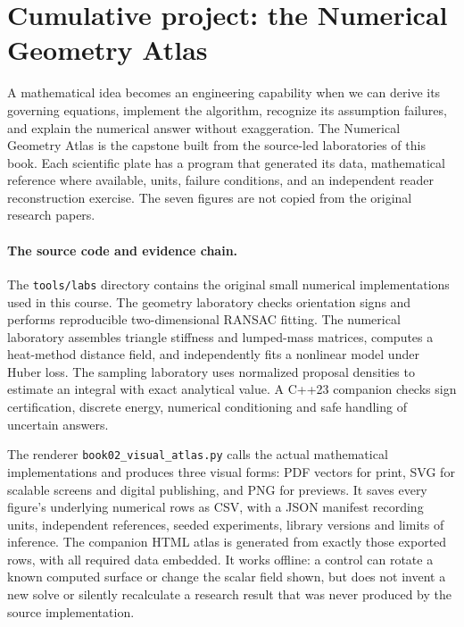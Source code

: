 \clearpage
\section*{Cumulative project: the Numerical Geometry Atlas}

\noindent A mathematical idea becomes an engineering capability when we can
derive its governing equations, implement the algorithm, recognize its
assumption failures, and explain the numerical answer without exaggeration.
The Numerical Geometry Atlas is the capstone built from the source-led
laboratories of this book. Each scientific plate has a program that generated
its data, mathematical reference where available, units, failure conditions,
and an independent reader reconstruction exercise. The seven figures are
not copied from the original research papers.

\paragraph{The source code and evidence chain.}
The \texttt{tools/labs} directory contains the original small numerical
implementations used in this course. The geometry laboratory checks
orientation signs and performs reproducible two-dimensional RANSAC fitting.
The numerical laboratory assembles triangle stiffness and lumped-mass
matrices, computes a heat-method distance field, and independently fits
a nonlinear model under Huber loss. The sampling laboratory uses normalized
proposal densities to estimate an integral with exact analytical value.
A C++23 companion checks sign certification, discrete energy, numerical
conditioning and safe handling of uncertain answers.

The renderer \texttt{book02\_visual\_atlas.py} calls the actual mathematical
implementations and produces three visual forms: PDF vectors for print, SVG
for scalable screens and digital publishing, and PNG for previews. It saves
every figure's underlying numerical rows as CSV, with a JSON manifest
recording units, independent references, seeded experiments, library versions
and limits of inference. The companion HTML atlas is generated from exactly
those exported rows, with all required data embedded. It works offline:
a control can rotate a known computed surface or change the scalar field
shown, but does not invent a new solve or silently recalculate a research
result that was never produced by the source implementation.

